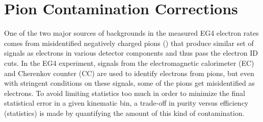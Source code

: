 \section{Pion Contamination Corrections}

One of the two major sources of backgrounds in the measured EG4 electron rates comes from misidentified negatively charged pions (\pim) that produce similar set of signals as electrons in various detector components and thus pass the electron ID cuts. In the EG4 experiment, signals from the electromagnetic calorimeter (EC) and Cherenkov counter (CC) are used to %
identify %
electrons from pions, but even with stringent conditions on these signals, some of the pions get misidentified as electrons. To avoid limiting statistics too much in order to minimize the final statistical error in a given kinematic bin, a trade-off in purity versus efficiency (statistics) is made by quantifying the amount of this kind of contamination.

